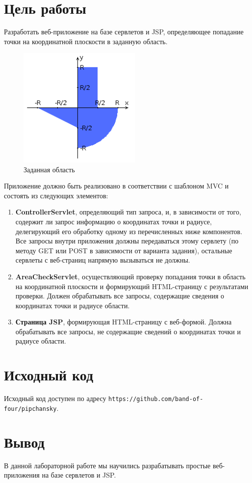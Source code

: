 \documentclass[listings]{labreport}
\begin{document}
\maketitlepage

\section*{Цель работы}

Разработать веб-приложение на базе сервлетов и JSP, определяющее попадание точки на координатной плоскости в заданную область.

\begin{figure}[ht]
  \centering
  \includegraphics[width=6cm]{graph.png}
  \caption{Заданная область}
\end{figure}

Приложение должно быть реализовано в соответствии с шаблоном MVC и состоять из следующих элементов:

\begin{enumerate}
\item \textbf{ControllerServlet}, определяющий тип запроса, и, в зависимости
от того, содержит ли запрос информацию о координатах точки и радиусе, 
делегирующий его обработку одному из перечисленных ниже компонентов. 
Все запросы внутри приложения должны передаваться этому сервлету 
(по методу GET или POST в зависимости от варианта задания), 
остальные сервлеты с веб-страниц напрямую вызываться не должны.
\item \textbf{AreaCheckServlet}, осуществляющий проверку попадания 
точки в область на координатной плоскости и формирующий HTML-страницу 
с результатами проверки. Должен обрабатывать все запросы, содержащие 
сведения о координатах точки и радиусе области.
\item \textbf{Страница JSP}, формирующая HTML-страницу с веб-формой. 
Должна обрабатывать все запросы, не содержащие сведений о координатах 
точки и радиусе области.
\end{enumerate}

\section*{Исходный код}

Исходный код доступен по адресу \texttt{https://github.com/band-of-four/pipchansky}.

\section*{Вывод}

В данной лабораторной работе мы научились разрабатывать простые веб-приложения на базе сервлетов и JSP.
\end{document}
